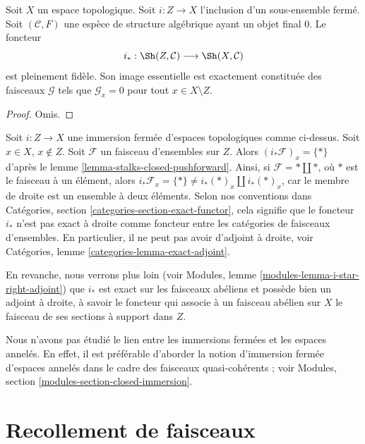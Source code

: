 \begin{lemma}
\label{lemma-equivalence-categories-closed-structures}
Soit $X$ un espace topologique.
Soit $i : Z \to X$ l'inclusion d'un sous-ensemble fermé.
Soit $(\mathcal{C}, F)$ une espèce de structure algébrique
ayant un objet final $0$. Le foncteur
$$
i_* : \Sh(Z, \mathcal{C}) \longrightarrow \Sh(X, \mathcal{C})
$$
est pleinement fidèle. Son image essentielle est exactement constituée
des faisceaux $\mathcal{G}$ tels que
$\mathcal{G}_x = 0$ pour tout $x \in X \setminus Z$.
\end{lemma}

\begin{proof}
Omis.
\end{proof}

\begin{remark}
\label{remark-i-star-not-exact}
Soit $i : Z \to X$ une immersion fermée d'espaces topologiques comme
ci-dessus. Soit $x \in X$, $x \not \in Z$. Soit $\mathcal{F}$ un faisceau
d'ensembles sur $Z$. Alors $(i_*\mathcal{F})_x = \{ * \}$
d'après le lemme \ref{lemma-stalks-closed-pushforward}.
Ainsi, si $\mathcal{F} = * \amalg *$, où
$*$ est le faisceau à un élément, alors
$i_*\mathcal{F}_x = \{*\} \not = i_*(*)_x \amalg i_*(*)_x$,
car le membre de droite est un ensemble à deux éléments.
Selon nos conventions dans
Catégories, section \ref{categories-section-exact-functor},
cela signifie que le foncteur $i_*$ n'est pas exact à droite
comme foncteur entre les catégories de faisceaux d'ensembles.
En particulier, il ne peut pas avoir d'adjoint à droite, voir
Catégories, lemme \ref{categories-lemma-exact-adjoint}.

\medskip\noindent
En revanche, nous verrons plus loin (voir
Modules, lemme \ref{modules-lemma-i-star-right-adjoint})
que $i_*$ est exact sur les faisceaux abéliens et possède bien un adjoint
à droite, à savoir le foncteur qui associe à un faisceau abélien sur $X$
le faisceau de ses sections à support dans $Z$.
\end{remark}

\begin{remark}
\label{remark-closed-immersion-spaces}
Nous n'avons pas étudié le lien entre les immersions fermées et les
espaces annelés. En effet, il est préférable d'aborder la notion
d'immersion fermée d'espaces annelés dans le cadre des faisceaux
quasi-cohérents ; voir Modules, section
\ref{modules-section-closed-immersion}.
\end{remark}

\section{Recollement de faisceaux}
\label{section-glueing-sheaves}

